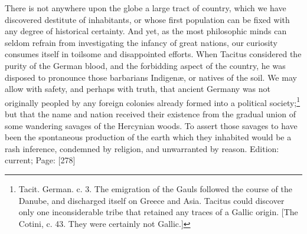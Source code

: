 There is not anywhere upon the globe a large tract of country, which we have discovered destitute of inhabitants, or whose first population can be fixed with any degree of historical certainty. And yet, as the most philosophic minds can seldom refrain from investigating the infancy of great nations, our curiosity consumes itself in toilsome and disappointed efforts. When Tacitus considered the purity of the German blood, and the forbidding aspect of the country, he was disposed to pronounce those barbarians Indigenæ, or natives of the soil. We may allow with safety, and perhaps with truth, that ancient Germany was not originally peopled by any foreign colonies already formed into a political society;\footnote{Tacit. German. c. 3. The emigration of the Gauls followed the course of the Danube, and discharged itself on Greece and Asia. Tacitus could discover only one inconsiderable tribe that retained any traces of a Gallic origin. [The Cotini, c. 43. They were certainly not Gallic.]} but that the name and nation received their existence from the gradual union of some wandering savages of the Hercynian woods. To assert those savages to have been the spontaneous production of the earth which they inhabited would be a rash inference, condemned by religion, and unwarranted by reason.
Edition: current; Page: [278]


